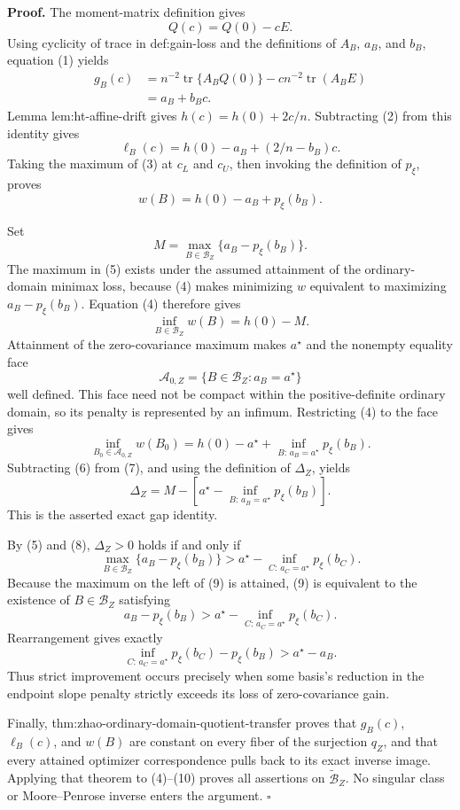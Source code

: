 \textbf{Proof.}
The moment-matrix definition gives
\[
Q(c)=Q(0)-cE.
\tag{1}
\]
Using cyclicity of trace in def:gain-loss and the definitions of \(A_B\), \(a_B\), and \(b_B\), equation (1) yields
\[
\begin{aligned}
g_B(c)
&=n^{-2}\operatorname{tr}\{A_BQ(0)\}
-cn^{-2}\operatorname{tr}(A_BE)\\
&=a_B+b_Bc.
\end{aligned}
\tag{2}
\]
Lemma lem:ht-affine-drift gives \(h(c)=h(0)+2c/n\).  Subtracting (2) from this identity gives
\[
\ell_B(c)=h(0)-a_B+(2/n-b_B)c.
\tag{3}
\]
Taking the maximum of (3) at \(c_L\) and \(c_U\), then invoking the definition of \(p_\xi\), proves
\[
w(B)=h(0)-a_B+p_\xi(b_B).
\tag{4}
\]

Set
\[
M=\max_{B\in\mathcal B_Z}\{a_B-p_\xi(b_B)\}.
\tag{5}
\]
The maximum in (5) exists under the assumed attainment of the ordinary-domain minimax loss, because (4) makes minimizing \(w\) equivalent to maximizing \(a_B-p_\xi(b_B)\).  Equation (4) therefore gives
\[
\inf_{B\in\mathcal B_Z}w(B)=h(0)-M.
\tag{6}
\]
Attainment of the zero-covariance maximum makes \(a^\star\) and the nonempty equality face
\[
\mathcal A_{0,Z}=\{B\in\mathcal B_Z:a_B=a^\star\}
\]
well defined.  This face need not be compact within the positive-definite ordinary domain, so its penalty is represented by an infimum.  Restricting (4) to the face gives
\[
\inf_{B_0\in\mathcal A_{0,Z}}w(B_0)
=h(0)-a^\star+
\inf_{B:\,a_B=a^\star}p_\xi(b_B).
\tag{7}
\]
Subtracting (6) from (7), and using the definition of \(\Delta_Z\), yields
\[
\Delta_Z
=M-\left[
a^\star-
\inf_{B:\,a_B=a^\star}p_\xi(b_B)
\right].
\tag{8}
\]
This is the asserted exact gap identity.

By (5) and (8), \(\Delta_Z>0\) holds if and only if
\[
\max_{B\in\mathcal B_Z}\{a_B-p_\xi(b_B)\}
>
a^\star-
\inf_{C:\,a_C=a^\star}p_\xi(b_C).
\tag{9}
\]
Because the maximum on the left of (9) is attained, (9) is equivalent to the existence of \(B\in\mathcal B_Z\) satisfying
\[
a_B-p_\xi(b_B)
>
a^\star-
\inf_{C:\,a_C=a^\star}p_\xi(b_C).
\]
Rearrangement gives exactly
\[
\inf_{C:\,a_C=a^\star}p_\xi(b_C)-p_\xi(b_B)
>a^\star-a_B.
\tag{10}
\]
Thus strict improvement occurs precisely when some basis's reduction in the endpoint slope penalty strictly exceeds its loss of zero-covariance gain.

Finally, thm:zhao-ordinary-domain-quotient-transfer proves that \(g_B(c)\), \(\ell_B(c)\), and \(w(B)\) are constant on every fiber of the surjection \(q_Z\), and that every attained optimizer correspondence pulls back to its exact inverse image.  Applying that theorem to (4)--(10) proves all assertions on \(\widetilde{\mathcal B}_Z\).  No singular class or Moore--Penrose inverse enters the argument. \(\square\)